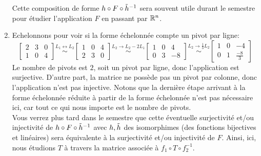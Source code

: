 \begin{exercice}
\begin{enumerate}
    \noindent Cette composition de forme $h \circ F \circ \Tilde{h}^{-1}$ sera souvent utile durant le semestre pour étudier l'application $F$ en passant par $\mathbb{R}^n$.
    \item Echelonnons pour voir si la forme échelonnée compte un pivot par ligne:
    $$\begin{bmatrix} 
    2 & 3 & 0 \\ 
    1 & 0 & 4 
    \end{bmatrix} \overset{L_{1} \leftrightarrow L_{2}}{\sim} 
    \begin{bmatrix} 
    1 & 0 & 4 \\ 
    2 & 3 & 0 
    \end{bmatrix} \overset{L_{2} \rightarrow L_{2}-2L_{1}}{\sim} 
    \begin{bmatrix} 
    1 & 0 & 4 \\ 
    0 & 3 & -8 
    \end{bmatrix} \overset{L_{2} \rightarrow \frac{1}{3}L_2}{\sim}
    \begin{bmatrix} 
    1 & 0 & -4 \\ 
    0 & 1 & \frac{-8}{3} 
    \end{bmatrix}$$
    Le nombre de pivots est $2$, soit un pivot par ligne, donc l'application est surjective. D'autre part, la matrice ne possède pas un pivot par colonne, donc l'application n'est pas injective. Notons que la dernière étape arrivant à la forme échelonnée réduite à partir de la forme échelonnée n'est pas nécessaire ici, car tout ce qui nous importe est le nombre de pivots. \\
    
    \noindent Vous verrez plus tard dans le semestre que cette éventuelle surjectivité et/ou injectivité de $h \circ F \circ \Tilde{h}^{-1}$ avec $h, \Tilde{h}$ des isomorphimes (des fonctions bijectives et linéaires) sera équivalente à la surjectivité et/ou injectivité de $F$. Ainsi, ici, nous étudions $T$ à travers la matrice associée à $f_1 \circ T \circ f_2^{-1}$. \\
    
\end{enumerate}
\end{exercice}